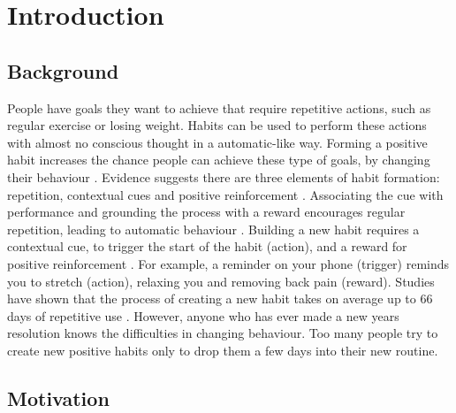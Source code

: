 
\section{Introduction}

\subsection*{Background}
People have goals they want to achieve that require repetitive actions, such as regular exercise or losing weight. Habits can be used to perform these actions with almost no conscious thought in a automatic-like way. Forming a positive habit increases the chance people can achieve these type of goals, by changing their behaviour \cite{article_promoting_habit_formation}. Evidence suggests there are three elements of habit formation: repetition, contextual cues and positive reinforcement \cite{article_beyond_self_tracking_designing_apps}. Associating the cue with performance and grounding the process with a reward encourages regular repetition, leading to automatic behaviour \cite{article_experiences_of_habit_formation}. Building a new habit requires a contextual cue, to trigger the start of the habit (action), and a reward for positive reinforcement \cite{article_beyond_self_tracking_designing_apps, article_how_habits_formed_modelling_habit_formation}. For example, a reminder on your phone (trigger) reminds you to stretch (action), relaxing you and removing back pain (reward). Studies have shown that the process of creating a new habit takes on average up to 66 days of repetitive use \cite{article_how_habits_formed_modelling_habit_formation}. However, anyone who has ever made a new years resolution knows the difficulties in changing behaviour. Too many people try to create new positive habits only to drop them a few days into their new routine.

\subsection*{Motivation}

